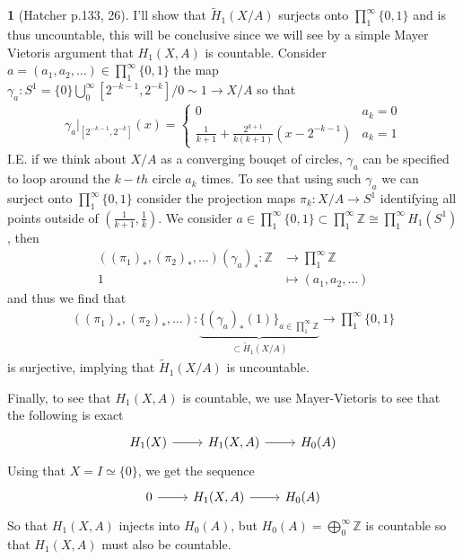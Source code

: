 \documentclass[10.5pt]{article}
\theoremstyle{definition}
\newtheorem{pb}{}
\newcommand{\set}[1]{\{#1\}}
\begin{document}
    \begin{pb}[Hatcher p.133, 26]
        I'll show that \(\tilde{H}_1(X/A)\) surjects onto \(\prod_1^\infty \set{0,1}\) and is thus uncountable, this will be conclusive since we will see by a simple Mayer Vietoris argument that \(H_1(X,A)\) is countable. Consider \(a = (a_1,a_2,\hdots) \in \prod_1^\infty \set{0,1}\) the map \(\gamma_a: S^1 = \set{0}\bigcup_0^\infty [2^{-k-1},2^{-k}]/0 \sim 1 \to X/A\) so that
        \begin{align*}
            \gamma_a\vert_{[2^{-k-1},2^{-k}]}(x) = \begin{cases}
                0 & a_k = 0 \\
                \frac{1}{k+1} + \frac{2^{k+1}}{k(k+1)}(x - 2^{-k-1}) & a_k = 1
            \end{cases}
        \end{align*}
        I.E. if we think about \(X/A\) as a converging bouqet of circles, \(\gamma_a\) can be specified to loop around the \(k-th\) circle \(a_k\) times. To see that using such \(\gamma_a\) we can surject onto \(\prod_1^\infty \set{0,1}\) consider the projection maps \(\pi_k: X/A \to S^1\) identifying all points outside of \((\frac{1}{k+1},\frac{1}{k})\). We consider \(a \in \prod_1^\infty \set{0,1} \subset \prod_1^\infty \mathbb{Z} \cong \prod_1^\infty H_1(S^1)\), then
        \begin{align*}
            ((\pi_1)_*,(\pi_2)_*,\hdots)(\gamma_a)_*: \mathbb{Z} &\to \prod_1^\infty \mathbb{Z}\\ 1 &\mapsto (a_1,a_2, \hdots)
        \end{align*}
        and thus we find that
        \begin{align*}
            ((\pi_1)_*,(\pi_2)_*,\hdots): \underbrace{\set{(\gamma_a)_*(1)}_{a \in \prod_1^\infty \mathbb{Z}}}_{\subset \tilde{H}_1(X/A)} \to \prod_1^\infty \set{0,1}
        \end{align*}
        is surjective, implying that \(\tilde{H}_1(X/A)\) is uncountable.

        Finally, to see that \(H_1(X,A)\) is countable, we use Mayer-Vietoris to see that the following is exact
        \begin{equation*}
            \begin{tikzcd}
                H_1(X) \arrow{r} &H_1(X,A) \arrow{r} &H_0(A)
            \end{tikzcd}
        \end{equation*}
        Using that \(X = I \simeq \set{0}\), we get the sequence
        \begin{equation*}
            \begin{tikzcd}
                0 \arrow{r} &H_1(X,A) \arrow{r} &H_0(A)
            \end{tikzcd}
        \end{equation*}
        So that \(H_1(X,A)\) injects into \(H_0(A)\), but \(H_0(A) = \bigoplus_0^\infty \mathbb{Z}\) is countable so that \(H_1(X,A)\) must also be countable.
    \end{pb}
\end{document}

